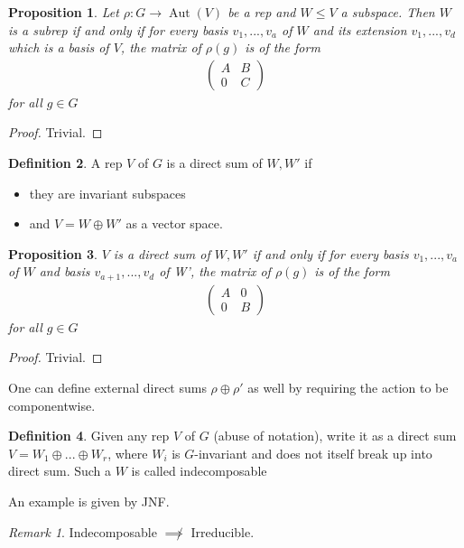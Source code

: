 \documentclass{article}
\theoremstyle{definition}
\newtheorem{defn}{Definition}[section]
\theoremstyle{remark}
\newtheorem{rem}{Remark}
\theoremstyle{plain}
\newtheorem{prop}[defn]{Proposition}
\begin{document}
 \begin{prop}
     Let $\rho:G\to\operatorname{Aut}(V)$ be a rep and $W\le V$ a subspace. Then $W$ is a subrep if and only if for every basis $v_1,...,v_a$ of $W$ and its extension $v_1,...,v_d$ which is a basis of $V$, the matrix of $\rho(g)$ is of the form
     \begin{align*}
     \begin{pmatrix}
         A & B\\ 0&C
     \end{pmatrix}
     \end{align*} for all $g\in G$
 \end{prop}
 \begin{proof}
 Trivial.
 \end{proof}
 \begin{defn}
     A rep $V$ of $G$ is a direct sum of $W,W'$ if 
     \begin{itemize}
         \item they are invariant subspaces
         \item and $V=W\oplus W'$ as a vector space.
     \end{itemize}
 \end{defn}
 \begin{prop}
     $V$ is a direct sum of $W,W'$ if and only if for every basis $v_1,...,v_a$ of $W$ and basis $v_{a+1},...,v_{d}$ of W', the matrix of $\rho(g)$ is of the form
     \begin{align*}
         \begin{pmatrix}
             A&0\\0&B
         \end{pmatrix}
     \end{align*} for all $g\in G$
 \end{prop}
 \begin{proof}
     Trivial.
 \end{proof}
 One can define external direct sums $\rho\oplus\rho'$ as well by requiring the action to be componentwise.
 \begin{defn}
     Given any rep $V$ of $G$ (abuse of notation), write it as a direct sum $V=W_1\oplus...\oplus W_r$, where $W_i$ is $G$-invariant and does not itself break up into direct sum. Such a $W$ is called indecomposable
 \end{defn}
 An example is given by JNF.
 \begin{rem}
     Indecomposable $\not\implies$ Irreducible.
 \end{rem}
\end{document}
